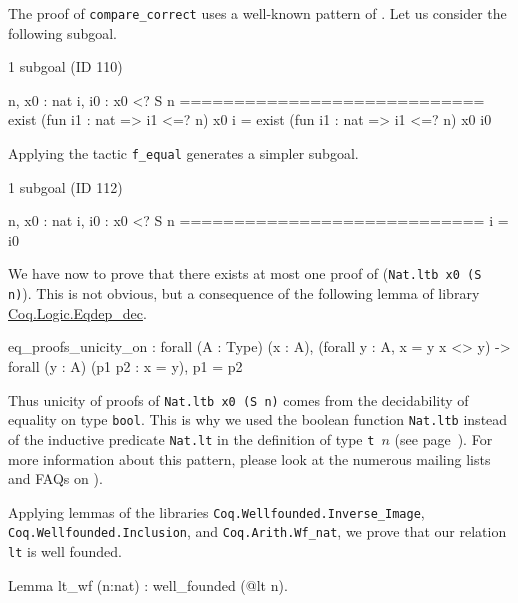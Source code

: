 \documentclass[a4paper]{book}
\begin{document}
\begin{remark}
 The proof of \texttt{compare\_correct} uses a well-known pattern of \coq{}.
Let us consider  the following subgoal.

\begin{Coqanswer}
 1 subgoal (ID 110)
  
  n, x0 : nat
  i, i0 : x0 <? S n
  ============================
  exist (fun i1 : nat => i1 <=? n) x0 i =
  exist (fun i1 : nat => i1 <=? n) x0 i0
\end{Coqanswer}

Applying the tactic \texttt{f\_equal} generates a simpler subgoal.

\begin{Coqanswer}
1 subgoal (ID 112)
  
  n, x0 : nat
  i, i0 : x0 <? S n
  ============================
  i = i0
\end{Coqanswer}

We have now to prove that there exists at most one  proof of (\texttt{Nat.ltb x0 (S n)}). This is not obvious, but  a consequence of the following lemma of library 
\href{https://coq.inria.fr/distrib/current/stdlib/Coq.Logic.Eqdep_dec.html}{Coq.Logic.Eqdep\_dec}.

\label{sect:eq-proof-unicity}

\begin{Coqanswer}
eq_proofs_unicity_on :
forall (A : Type) (x : A),
(forall y : A, x = y \/ x <> y) -> 
forall (y : A) (p1 p2 : x = y), p1 = p2
\end{Coqanswer}

Thus unicity of proofs of \texttt{Nat.ltb x0 (S n)}  comes from the decidability of
equality on type \texttt{bool}.
This is why we used the boolean function \texttt{Nat.ltb} instead of the inductive predicate \texttt{Nat.lt} in the definition of type \texttt{t $n$} (see page~\pageref{def: Finite-ord-type}).
For more information about this pattern, please look at the numerous mailing lists and 
FAQs on \coq{}).



\end{remark}


Applying lemmas of the libraries \texttt{Coq.Wellfounded.Inverse\_Image}, \linebreak
 \texttt{Coq.Wellfounded.Inclusion}, and \texttt{Coq.Arith.Wf\_nat}, we prove that our
relation \texttt{lt} is well founded.

\begin{Coqsrc}
Lemma lt_wf (n:nat) : well_founded (@lt n).
\end{Coqsrc}
\end{document}
